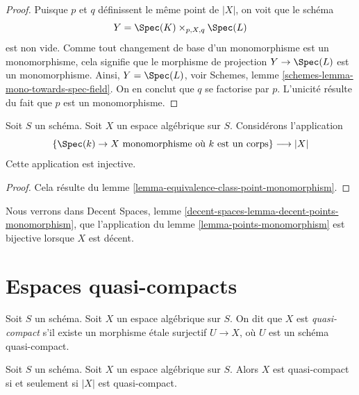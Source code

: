 \begin{proof}
Puisque $p$ et $q$ définissent le même point de $|X|$, on voit que le schéma
$$
Y = \Spec(K) \times_{p, X, q} \Spec(L)
$$
est non vide. Comme tout changement de base d'un monomorphisme est un monomorphisme,
cela signifie que le morphisme de projection $Y \to \Spec(L)$
est un monomorphisme. Ainsi, $Y = \Spec(L)$, voir
Schemes, lemme \ref{schemes-lemma-mono-towards-spec-field}.
On en conclut que $q$ se factorise par $p$. L'unicité
résulte du fait que $p$ est un monomorphisme.
\end{proof}

\begin{lemma}
\label{lemma-points-monomorphism}
Soit $S$ un schéma. Soit $X$ un espace algébrique sur $S$.
Considérons l'application
$$
\{\Spec(k) \to X \text{ monomorphisme où }k\text{ est un corps}\}
\longrightarrow
|X|
$$
Cette application est injective.
\end{lemma}

\begin{proof}
Cela résulte du lemme \ref{lemma-equivalence-class-point-monomorphism}.
\end{proof}

\noindent
Nous verrons dans Decent Spaces,
lemme \ref{decent-spaces-lemma-decent-points-monomorphism},
que l'application du lemme \ref{lemma-points-monomorphism}
est bijective lorsque $X$ est décent.

















\section{Espaces quasi-compacts}
\label{section-quasi-compact}

\begin{definition}
\label{definition-quasi-compact}
Soit $S$ un schéma.
Soit $X$ un espace algébrique sur $S$.
On dit que $X$ est {\it quasi-compact} s'il existe un morphisme
étale surjectif $U \to X$, où $U$ est un schéma quasi-compact.
\end{definition}

\begin{lemma}
\label{lemma-quasi-compact-space}
Soit $S$ un schéma.
Soit $X$ un espace algébrique sur $S$.
Alors $X$ est quasi-compact si et seulement si $|X|$ est quasi-compact.
\end{lemma}

